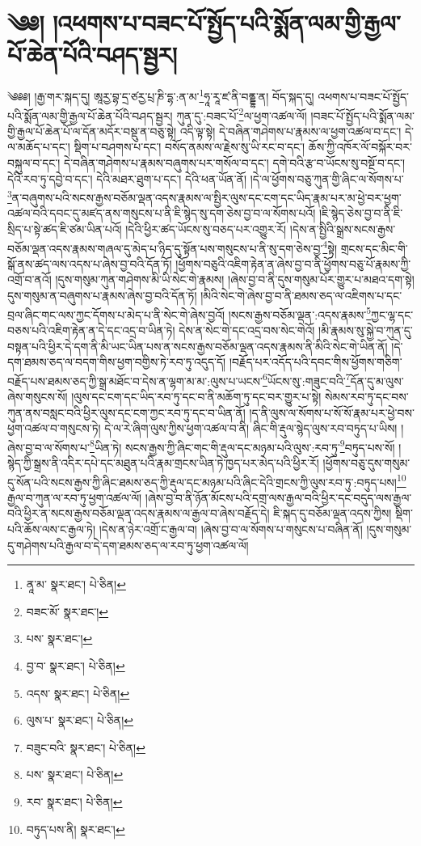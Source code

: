 \setcounter{footnote}{0} 
\chapter{༄༅། །འཕགས་པ་བཟང་པོ་སྤྱོད་པའི་སྨོན་ལམ་གྱི་རྒྱལ་པོ་ཆེན་པོའི་བཤད་སྦྱར།}༄༅༅། །རྒྱ་གར་སྐད་དུ། ཨཱརྱ་བྷ་དྲ་ཙརྱ་པྲ་ཎི་དྷ་:ན་མ་\footnote{ནཱ་མ་  སྣར་ཐང་།  པེ་ཅིན། }ཧཱ་རཱ་ཛ་ནི་བནྡྷ་ན། བོད་སྐད་དུ། འཕགས་པ་བཟང་པོ་སྤྱོད་པའི་སྨོན་ལམ་གྱི་རྒྱལ་པོ་ཆེན་པོའི་བཤད་སྦྱར། ཀུན་དུ་:བཟང་པོ་\footnote{བཟང་མོ་  སྣར་ཐང་། }ལ་ཕྱག་འཚལ་ལོ། །བཟང་པོ་སྤྱོད་པའི་སྨོན་ལམ་གྱི་རྒྱལ་པོ་ཆེན་པོ་ལ་དོན་མདོར་བསྡུ་ན་བཅུ་སྟེ། འདི་ལྟ་སྟེ། དེ་བཞིན་གཤེགས་པ་རྣམས་ལ་ཕྱག་འཚལ་བ་དང་། དེ་ལ་མཆོད་པ་དང་། སྡིག་པ་བཤགས་པ་དང་། བསོད་ནམས་ལ་རྗེས་སུ་ཡི་རང་བ་དང་། ཆོས་ཀྱི་འཁོར་ལོ་བསྐོར་བར་བསྐུལ་བ་དང་། དེ་བཞིན་གཤེགས་པ་རྣམས་བཞུགས་པར་གསོལ་བ་དང་། དགེ་བའི་རྩ་བ་ཡོངས་སུ་བསྔོ་བ་དང་། དེའི་རབ་ཏུ་དབྱེ་བ་དང་། དེའི་མཐར་ཐུག་པ་དང་། དེའི་ཕན་ཡོན་ནོ། །དེ་ལ་ཕྱོགས་བཅུ་ཀུན་གྱི་ཞིང་ལ་སོགས་པ་\footnote{པས་  སྣར་ཐང་། }ན་བཞུགས་པའི་སངས་རྒྱས་བཅོམ་ལྡན་འདས་རྣམས་ལ་སྤྱིར་ལུས་དང་ངག་དང་ཡིད་རྣམ་པར་མ་ཕྱེ་བར་ཕྱག་འཚལ་བའི་དབང་དུ་མཛད་ནས་གསུངས་པ་ནི་ཇི་སྙེད་སུ་དག་ཅེས་བྱ་བ་ལ་སོགས་པའོ། །ཇི་སྙེད་ཅེས་བྱ་བ་ནི་ཇི་སྲིད་པ་སྟེ་ཚད་ཇི་ཙམ་ཡིན་པའོ། །དེའི་ཕྱིར་ཚད་ཡོངས་སུ་བཅད་པར་འགྱུར་རོ། །དེས་ན་སྤྱིའི་སྒྲས་སངས་རྒྱས་བཅོམ་ལྡན་འདས་རྣམས་གཞལ་དུ་མེད་པ་ཉིད་དུ་སྟོན་པས་གསུངས་པ་ནི་སུ་དག་ཅེས་བྱ་\footnote{བྱ་བ་  སྣར་ཐང་།  པེ་ཅིན། }སྟེ། གྲངས་དང་མིང་གི་སྒོ་ནས་ཚད་ལས་འདས་པ་ཞེས་བྱ་བའི་དོན་ཏོ། །ཕྱོགས་བཅུའི་འཇིག་རྟེན་ན་ཞེས་བྱ་བ་ནི་ཕྱོགས་བཅུ་པོ་རྣམས་ཀྱི་འགྲོ་བ་ནའོ། །དུས་གསུམ་ཀུན་གཤེགས་མི་ཡི་སེང་གེ་རྣམས། །ཞེས་བྱ་བ་ནི་དུས་གསུམ་པོར་གྱུར་པ་མཐའ་དག་སྟེ། དུས་གསུམ་ན་བཞུགས་པ་རྣམས་ཞེས་བྱ་བའི་དོན་ཏོ། །མིའི་སེང་གེ་ཞེས་བྱ་བ་ནི་ཐམས་ཅད་ལ་འཇིགས་པ་དང་བྲལ་ཞིང་གང་ལས་ཀྱང་དོགས་པ་མེད་པ་ནི་སེང་གེ་ཞེས་བྱའོ། །སངས་རྒྱས་བཅོམ་ལྡན་:འདས་རྣམས་\footnote{འདས་  སྣར་ཐང་།  པེ་ཅིན། }ཀྱང་ལྷ་དང་བཅས་པའི་འཇིག་རྟེན་ན་དེ་དང་འདྲ་བ་ཡིན་ཏེ། དེས་ན་སེང་གེ་དང་འདྲ་བས་སེང་གེའོ། །མི་རྣམས་སུ་སྐྱེ་བ་ཀུན་དུ་བསྟན་པའི་ཕྱིར་དེ་དག་ནི་མི་ཡང་ཡིན་པས་ན་སངས་རྒྱས་བཅོམ་ལྡན་འདས་རྣམས་ནི་མིའི་སེང་གེ་ཡིན་ནོ། །དེ་དག་ཐམས་ཅད་ལ་བདག་གིས་ཕྱག་བགྱིས་ཏེ་རབ་ཏུ་འདུད་དོ། །བརྗོད་པར་འདོད་པའི་དབང་གིས་ཕྱོགས་གཅིག་བརྗོད་པས་ཐམས་ཅད་ཀྱི་སྒྲ་མཐོང་བ་དེས་ན་ལྷག་མ་མ་:ལུས་པ་ཡངས་\footnote{ལུས་པ་  སྣར་ཐང་།  པེ་ཅིན། }ཡོངས་སུ་:གཟུང་བའི་\footnote{བཟུང་བའི་  སྣར་ཐང་།  པེ་ཅིན། }དོན་དུ་མ་ལུས་ཞེས་གསུངས་སོ། །ལུས་དང་ངག་དང་ཡིད་རབ་ཏུ་དང་བ་ནི་མཆོག་ཏུ་དང་བར་གྱུར་པ་སྟེ། སེམས་རབ་ཏུ་དང་བས་ཀུན་ནས་བསླང་བའི་ཕྱིར་ལུས་དང་ངག་ཀྱང་རབ་ཏུ་དང་བ་ཡིན་ནོ། །ད་ནི་ལུས་ལ་སོགས་པ་སོ་སོ་རྣམ་པར་ཕྱེ་བས་ཕྱག་འཚལ་བ་གསུངས་ཏེ། དེ་ལ་རེ་ཞིག་ལུས་ཀྱིས་ཕྱག་འཚལ་བ་ནི། ཞིང་གི་རྡུལ་སྙེད་ལུས་རབ་བཏུད་པ་ཡིས། །ཞེས་བྱ་བ་ལ་སོགས་པ་\footnote{པས་  སྣར་ཐང་།  པེ་ཅིན། }ཡིན་ཏེ། སངས་རྒྱས་ཀྱི་ཞིང་གང་གི་རྡུལ་དང་མཉམ་པའི་ལུས་:རབ་ཏུ་\footnote{རབ་  སྣར་ཐང་།  པེ་ཅིན། }བཏུད་པས་སོ། །སྙེད་ཀྱི་སྒྲས་ནི་འདིར་དཔེ་དང་མཐུན་པའི་རྣམ་གྲངས་ཡིན་ཏེ་ཁྱད་པར་མེད་པའི་ཕྱིར་རོ། །ཕྱོགས་བཅུ་དུས་གསུམ་དུ་སོན་པའི་སངས་རྒྱས་ཀྱི་ཞིང་ཐམས་ཅད་ཀྱི་རྡུལ་དང་མཉམ་པའི་ཞིང་དེའི་གྲངས་ཀྱི་ལུས་རབ་ཏུ་:བཏུད་པས།\footnote{བཏུད་པས་ནི།  སྣར་ཐང་། } རྒྱལ་བ་ཀུན་ལ་རབ་ཏུ་ཕྱག་འཚལ་ལོ། །ཞེས་བྱ་བ་ནི་ཉོན་མོངས་པའི་དགྲ་ལས་རྒྱལ་བའི་ཕྱིར་དང་བདུད་ལས་རྒྱལ་བའི་ཕྱིར་ན་སངས་རྒྱས་བཅོམ་ལྡན་འདས་རྣམས་ལ་རྒྱལ་བ་ཞེས་བརྗོད་དེ། ཇི་སྐད་དུ་བཅོམ་ལྡན་འདས་ཀྱིས། སྡིག་པའི་ཆོས་ལས་ང་རྒྱལ་ཏེ། །དེས་ན་ཉེར་འགྲོ་ང་རྒྱལ་བ། །ཞེས་བྱ་བ་ལ་སོགས་པ་གསུངས་པ་བཞིན་ནོ། །དུས་གསུམ་དུ་གཤེགས་པའི་རྒྱལ་བ་དེ་དག་ཐམས་ཅད་ལ་རབ་ཏུ་ཕྱག་འཚལ་ལོ། 